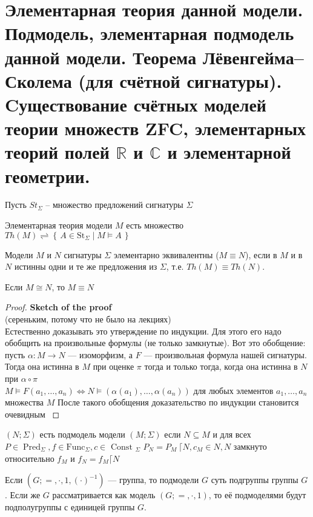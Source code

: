 \section{Элементарная теория данной модели. Подмодель, элементарная подмодель данной модели. Теорема
Лёвенгейма–Сколема (для счётной сигнатуры). Cуществование счётных моделей теории множеств ZFC, элементарных теорий
полей $\mathbb{R}$ и $\mathbb{C}$ и элементарной геометрии.}
Пусть $St_\varSigma$ -- множество предложений сигнатуры $\varSigma$
\begin{definition}
	Элементарная теория модели $M$ есть множество $T h(M) \rightleftharpoons \left\{\,A \in \mathrm{St}_{\Sigma}\mid M
	\vDash A\,\right\}$
\end{definition}
\begin{definition}
	Модели $M$ и $N$ сигнатуры $\varSigma$ элементарно эквивалентны ($M\equiv N$), если в $M$ и в $N$ истинны одни
	и те же предложения из $\varSigma$, т.е. $Th(M) \equiv Th(N)$.
\end{definition}
\begin{proposition}
	Если $M \cong N$, то $M \equiv N$
\end{proposition}
\begin{proof} \textcolor{mygray}{
		\textbf{Sketch of the proof} \\(сереньким, потому что не было на лекциях)\\
		Естественно доказывать это утверждение по индукции. Для
		этого его надо обобщить на произвольные формулы (не только замкнутые). Вот это обобщение: пусть $\alpha: M
		\rightarrow N$ — изоморфизм, а $F$ — произвольная формула нашей сигнатуры. Тогда она истинна в $M$ при
		оценке $\pi$ тогда и только тогда, когда она истинна в $N$ при $\alpha \circ \pi$\\
		$M  \models F\left(a_{1}, \ldots, a_{n}\right) \Leftrightarrow N  \models\left(\alpha\left(a_{1}\right),
		\ldots, \alpha\left(a_{n}\right)\right)$ для любых элементов $a_{1}, \dots, a_{n}$ множества $M$
		После такого обобщения доказательство по индукции становится
		очевидным
	}
\end{proof}
\begin{definition}
	$(N ; \Sigma)$  есть подмодель модели $(M ; \Sigma)$ если $N \subseteq M$ и для всех $P \in
	\operatorname{Pred}_{\Sigma}, f \in \mathrm{Func}_{\Sigma}, c \in \text { Const }_{\Sigma}$ $P_{N}=P_{M}\:
	\lceil N, c_{M} \in N, N$ замкнуто относительно $f_{M}$ и $f_{N}=f_{M}\lceil N$
\end{definition}
\begin{example}
	Если $\left(G ;=, \cdot, 1,(\cdot)^{-1}\right)$ — группа, то  подмодели $G$ суть подгруппы группы $G$. Если же
	$G$  рассматривается как модель $(G ;=, \cdot, 1)$, то её подмоделями будут подполугруппы с единицей группы
	$G$.
\end{example}
